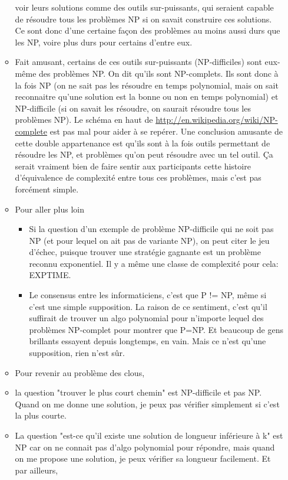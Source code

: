 \documentclass[a4paper]{article}
\begin{document}
\begin{itemize}
\begin{itemize}
voir leurs solutions comme des outils sur-puissants, qui seraient capable de
résoudre tous les problèmes NP si on savait construire ces solutions. Ce sont
donc d'une certaine façon des problèmes au moins aussi durs que les NP, voire
plus durs pour certains d'entre eux.
\item Fait amusant, certains de ces outils sur-puissants (NP-difficiles) sont
eux-même des problèmes NP. On dit qu'ils sont NP-complets. Ils sont donc à la
fois NP (on ne sait pas les résoudre en temps polynomial, mais on sait
reconnaitre qu'une solution est la bonne ou non en temps polynomial) et
NP-difficile (si on savait les résoudre, on saurait résoudre tous les problèmes
NP). Le schéma en haut de \url{http://en.wikipedia.org/wiki/NP-complete} est
pas mal pour aider à se repérer. Une conclusion amusante de cette double
appartenance est qu'ils sont à la fois outils permettant de résoudre les NP, et
problèmes qu'on peut résoudre avec un tel outil. Ça serait vraiment bien de
faire sentir aux participants cette histoire d'équivalence de complexité entre
tous ces problèmes, mais c'est pas forcément simple.
\item Pour aller plus loin
\begin{itemize}
\item Si la question d'un exemple de problème NP-difficile qui ne soit pas NP
(et pour lequel on ait pas de variante NP), on peut citer le jeu d'échec,
puisque trouver une stratégie gagnante est un problème reconnu exponentiel. Il
y a même une classe de complexité pour cela: EXPTIME.
\item Le consensus entre les informaticiens, c'est que P != NP, même si c'est
une simple supposition. La raison de ce sentiment, c'est qu'il suffirait de
trouver un algo polynomial pour n'importe lequel des problèmes NP-complet pour
montrer que P=NP. Et beaucoup de gens brillants essayent depuis longtemps, en
vain. Mais ce n'est qu'une supposition, rien n'est sûr.
\end{itemize}
\item Pour revenir au problème des clous,
\item la question "trouver le plus court chemin" est NP-difficile et pas NP.
Quand on me donne une solution, je peux pas vérifier simplement si c'est la
plus courte.
\item La question "est-ce qu'il existe une solution de longueur inférieure à k"
est NP car on ne connait pas d'algo polynomial pour répondre, mais quand on me
propose une solution, je peux vérifier sa longueur facilement. Et par ailleurs,

\end{itemize}
\end{itemize}
\end{document}
